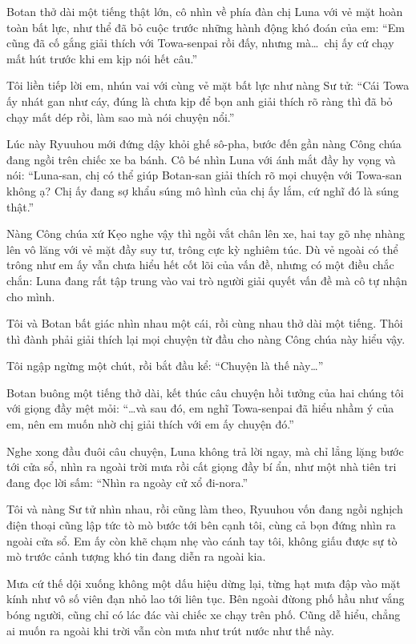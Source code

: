 \documentclass[../main.tex]{subfiles}
\begin{document}
Botan thở dài một tiếng thật lớn, cô nhìn về phía đàn chị Luna với vẻ mặt hoàn toàn bất lực, như thể đã bỏ cuộc trước những hành động khó đoán của em: ``Em cũng đã cố gắng giải thích với Towa-senpai rồi đấy, nhưng mà\dots\ chị ấy cứ chạy mất hút trước khi em kịp nói hết câu.''

Tôi liền tiếp lời em, nhún vai với cùng vẻ mặt bất lực như nàng Sư tử: ``Cái Towa ấy nhát gan như cáy, đúng là chưa kịp để bọn anh giải thích rõ ràng thì đã bỏ chạy mất dép rồi, làm sao mà nói chuyện nổi.''

Lúc này Ryuuhou mới đứng dậy khỏi ghế sô-pha, bước đến gần nàng Công chúa đang ngồi trên chiếc xe ba bánh. Cô bé nhìn Luna với ánh mắt đầy hy vọng và nói: ``Luna-san, chị có thể giúp Botan-san giải thích rõ mọi chuyện với Towa-san không ạ? Chị ấy đang sợ khẩu súng mô hình của chị ấy lắm, cứ nghĩ đó là súng thật.''

Nàng Công chúa xứ Kẹo nghe vậy thì ngồi vắt chân lên xe, hai tay gõ nhẹ nhàng lên vô lăng với vẻ mặt đầy suy tư, trông cực kỳ nghiêm túc. Dù vẻ ngoài có thể trông như em ấy vẫn chưa hiểu hết cốt lõi của vấn đề, nhưng có một điều chắc chắn: Luna đang rất tập trung vào vai trò người giải quyết vấn đề mà cô tự nhận cho mình.

Tôi và Botan bất giác nhìn nhau một cái, rồi cùng nhau thở dài một tiếng. Thôi thì đành phải giải thích lại mọi chuyện từ đầu cho nàng Công chúa này hiểu vậy.

Tôi ngập ngừng một chút, rồi bắt đầu kể: ``Chuyện là thế này\dots''

\ct

Botan buông một tiếng thở dài, kết thúc câu chuyện hồi tưởng của hai chúng tôi với giọng đầy mệt mỏi: ``\dots và sau đó, em nghĩ Towa-senpai đã hiểu nhầm ý của em, nên em muốn nhờ chị giải thích với em ấy chuyện đó.''

Nghe xong đầu đuôi câu chuyện, Luna không trả lời ngay, mà chỉ lẳng lặng bước tới cửa sổ, nhìn ra ngoài trời mưa rồi cất giọng đầy bí ẩn, như một nhà tiên tri đang đọc lời sấm: ``Nhìn ra ngoày cử xổ đi-nora.''

Tôi và nàng Sư tử nhìn nhau, rồi cũng làm theo, Ryuuhou vốn đang ngồi nghịch điện thoại cũng lập tức tò mò bước tới bên cạnh tôi, cùng cả bọn đứng nhìn ra ngoài cửa sổ. Em ấy còn khẽ chạm nhẹ vào cánh tay tôi, không giấu được sự tò mò trước cảnh tượng khó tin đang diễn ra ngoài kia.

Mưa cứ thế dội xuống không một dấu hiệu dừng lại, từng hạt mưa đập vào mặt kính như vô số viên đạn nhỏ lao tới liên tục. Bên ngoài đừong phố hầu như vắng bóng người, cũng chỉ có lác đác vài chiếc xe chạy trên phố. Cũng dễ hiểu, chẳng ai muốn ra ngoài khi trời vẫn còn mưa như trút nước như thế này.
\end{document}
